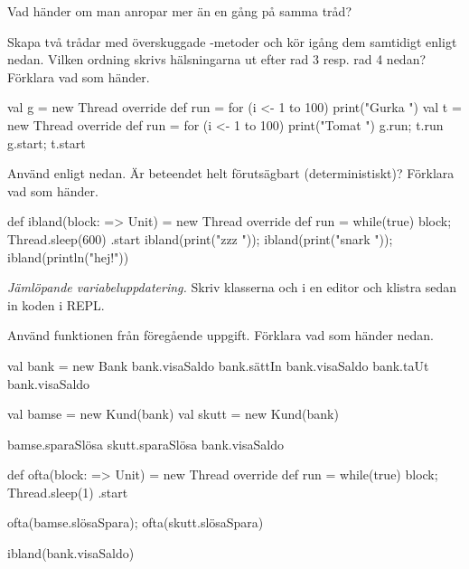 \Subtask Vad händer om man anropar  mer än en gång på samma tråd?

\Subtask Skapa två trådar med överskuggade -metoder och kör igång dem samtidigt enligt nedan. Vilken ordning skrivs hälsningarna ut efter rad 3 resp. rad 4 nedan? Förklara vad som händer.
\begin{REPL}
val g = new Thread{ override def run = for (i <- 1 to 100) print("Gurka ") }
val t = new Thread{ override def run = for (i <- 1 to 100) print("Tomat ") }
g.run; t.run
g.start; t.start
\end{REPL}

\Subtask Använd  enligt nedan. Är beteendet helt förutsägbart (deterministiskt)? Förklara vad som händer.
\begin{REPL}
def ibland(block: => Unit) = new Thread {
  override def run = while(true) { block; Thread.sleep(600) }
}.start
ibland(print("zzz ")); ibland(print("snark ")); ibland(println("hej!")) 
\end{REPL}


\Task \label{task:racecondition} \emph{Jämlöpande variabeluppdatering.} Skriv klasserna  och  i en editor och klistra sedan in koden i REPL.


\Subtask Använd funktionen  från föregående uppgift. Förklara vad som händer nedan.

\begin{REPL}
val bank = new Bank
bank.visaSaldo
bank.sättIn
bank.visaSaldo
bank.taUt
bank.visaSaldo

val bamse = new Kund(bank)
val skutt = new Kund(bank)

bamse.sparaSlösa
skutt.sparaSlösa
bank.visaSaldo

def ofta(block: => Unit) = new Thread {
  override def run = while(true) { block; Thread.sleep(1) }
}.start

ofta(bamse.slösaSpara); ofta(skutt.slösaSpara)

ibland(bank.visaSaldo)
\end{REPL}


